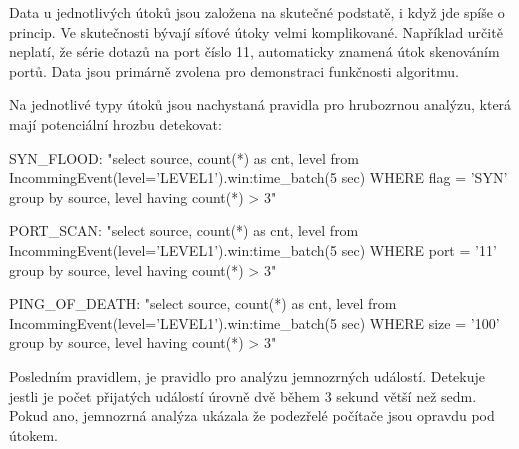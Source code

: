 \documentclass[
  digital, %
  table,   %
  nolof,     %
  nolot,     %
  oneside, %
  nocover,
  monochrome,
  12pt
]{fithesis3}
\begin{document}
Data u jednotlivých útoků jsou založena na skutečné podstatě, i když jde spíše o princip. Ve skutečnosti bývají síťové útoky velmi komplikované. Například určitě neplatí, že série dotazů na port číslo 11, automaticky znamená útok skenováním portů. Data jsou primárně zvolena pro demonstraci funkčnosti algoritmu.

Na jednotlivé typy útoků jsou nachystaná pravidla pro hrubozrnou analýzu, která mají potenciální hrozbu detekovat:

\begin{center}
\begin{minipage}[H]{\linewidth}
	\begin{mylisting}
SYN_FLOOD: "select source, count(*) as cnt, level from
IncommingEvent(level='LEVEL1').win:time_batch(5 sec) WHERE
flag = 'SYN' group by source, level having count(*) > 3"
	\end{mylisting}
	\label{fig:syn_flood_rule} 
\end{minipage}
\end{center}

\begin{center}
\begin{minipage}[H]{\linewidth}
	\begin{mylisting}
PORT_SCAN: "select source, count(*) as cnt, level from
IncommingEvent(level='LEVEL1').win:time_batch(5 sec) WHERE
port = '11' group by source, level having count(*) > 3"
	\end{mylisting}
	\label{fig:port_scan_rule} 
\end{minipage}
\end{center}

\begin{center}
\begin{minipage}[H]{\linewidth}
	\begin{mylisting}
PING_OF_DEATH: "select source, count(*) as cnt, level from
IncommingEvent(level='LEVEL1').win:time_batch(5 sec) WHERE
size = '100' group by source, level having count(*) > 3"
	\end{mylisting}
	\label{fig:ping_of_death_rule} 
\end{minipage}
\end{center}

Posledním pravidlem, je pravidlo pro analýzu jemnozrných událostí. Detekuje jestli je počet přijatých událostí úrovně dvě během 3 sekund větší než sedm. Pokud ano, jemnozrná analýza ukázala že podezřelé počítače jsou opravdu pod útokem.
\end{document}
